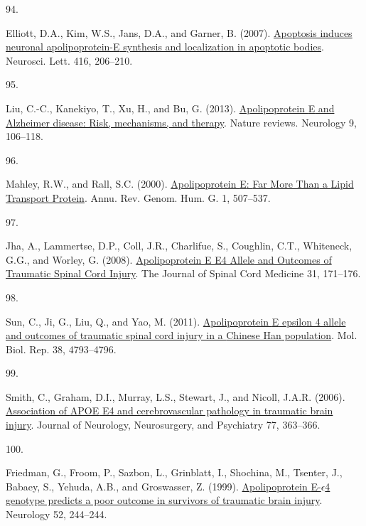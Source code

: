 \documentclass[
]{article}
\newlength{\cslhangindent}
\newlength{\csllabelwidth}
\newlength{\cslentryspacingunit} %
\newenvironment{CSLReferences}[2] %
 {%
  \setlength{\parindent}{0pt}
  \ifodd #1
  \let\oldpar\par
  \def\par{\hangindent=\cslhangindent\oldpar}
  \fi
  \setlength{\parskip}{#2\cslentryspacingunit}
 }%
 {}
\newcommand{\CSLLeftMargin}[1]{\parbox[t]{\csllabelwidth}{#1}}
\newcommand{\CSLRightInline}[1]{\parbox[t]{\linewidth - \csllabelwidth}{#1}\break}
\begin{document}
\begin{CSLReferences}{0}{0}
\leavevmode{}%
\CSLLeftMargin{94. }
\CSLRightInline{Elliott, D.A., Kim, W.S., Jans, D.A., and Garner, B. (2007). \href{https://doi.org/10.1016/j.neulet.2007.02.014}{Apoptosis induces neuronal apolipoprotein-{E} synthesis and localization in apoptotic bodies}. Neurosci. Lett. 416, 206--210.}

\leavevmode{}%
\CSLLeftMargin{95. }
\CSLRightInline{Liu, C.-C., Kanekiyo, T., Xu, H., and Bu, G. (2013). \href{https://doi.org/10.1038/nrneurol.2012.263}{Apolipoprotein {E} and {Alzheimer} disease: Risk, mechanisms, and therapy}. Nature reviews. Neurology 9, 106--118.}

\leavevmode{}%
\CSLLeftMargin{96. }
\CSLRightInline{Mahley, R.W., and Rall, S.C. (2000). \href{https://doi.org/10.1146/annurev.genom.1.1.507}{Apolipoprotein {E}: {Far More Than} a {Lipid Transport Protein}}. Annu. Rev. Genom. Hum. G. 1, 507--537.}

\leavevmode{}%
\CSLLeftMargin{97. }
\CSLRightInline{Jha, A., Lammertse, D.P., Coll, J.R., Charlifue, S., Coughlin, C.T., Whiteneck, G.G., and Worley, G. (2008). \href{https://www.ncbi.nlm.nih.gov/pmc/articles/PMC2565476}{Apolipoprotein {E E4 Allele} and {Outcomes} of {Traumatic Spinal Cord Injury}}. The Journal of Spinal Cord Medicine 31, 171--176.}

\leavevmode{}%
\CSLLeftMargin{98. }
\CSLRightInline{Sun, C., Ji, G., Liu, Q., and Yao, M. (2011). \href{https://doi.org/10.1007/s11033-010-0620-2}{Apolipoprotein {E} epsilon 4 allele and outcomes of traumatic spinal cord injury in a {Chinese Han} population}. Mol. Biol. Rep. 38, 4793--4796.}

\leavevmode{}%
\CSLLeftMargin{99. }
\CSLRightInline{Smith, C., Graham, D.I., Murray, L.S., Stewart, J., and Nicoll, J.A.R. (2006). \href{https://doi.org/10.1136/jnnp.2005.074617}{Association of {APOE} E4 and cerebrovascular pathology in traumatic brain injury}. Journal of Neurology, Neurosurgery, and Psychiatry 77, 363--366.}

\leavevmode{}%
\CSLLeftMargin{100. }
\CSLRightInline{Friedman, G., Froom, P., Sazbon, L., Grinblatt, I., Shochina, M., Tsenter, J., Babaey, S., Yehuda, A.B., and Groswasser, Z. (1999). \href{https://doi.org/10.1212/WNL.52.2.244}{Apolipoprotein {E-\(\epsilon\)4} genotype predicts a poor outcome in survivors of traumatic brain injury}. Neurology 52, 244--244.}


\end{CSLReferences}
\end{document}
